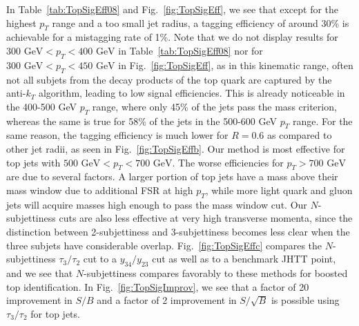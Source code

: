 \documentclass{JHEP3}
\DeclareRobustCommand{\Tab}[1]{Table~\ref{#1}}
\DeclareRobustCommand{\Fig}[1]{Fig.~\ref{#1}}
\begin{document}
In \Tab{tab:TopSigEff08} and \Fig{fig:TopSigEff}, we see that except for the highest $p_T$ range and a too small jet radius, a tagging efficiency of around 30\% is achievable for a mistagging rate of 1\%.  Note that we do not display results for $300 \text{ GeV} < p_T < 400 \text{ GeV}$ in \Tab{tab:TopSigEff08} nor for $300 \text{ GeV} < p_T < 450 \text{ GeV}$ in \Fig{fig:TopSigEff}, as in this kinematic range, often not all subjets from the decay products of the top quark are captured by the anti-$k_T$ algorithm, leading to low signal efficiencies.  This is already noticeable in the 400-500 GeV $p_T$ range, where only 45\% of the jets pass the mass criterion, whereas the same is true for 58\% of the jets in the 500-600 GeV $p_T$ range.  For the same reason, the tagging efficiency is much lower for $R=0.6$ as compared to other jet radii, as seen in \Fig{fig:TopSigEffb}.  Our method is most effective for top jets with $500 \text{ GeV} < p_T < 700 \text{ GeV}$.  The worse efficiencies for $p_T > 700 \text{ GeV}$ are due to several factors.  A larger portion of top jets have a mass above their mass window due to additional FSR at high $p_T$, while more light quark and gluon jets will acquire masses high enough to pass the mass window cut.  Our $N$-subjettiness cuts are also less effective at very high transverse momenta, since the distinction between 2-subjettiness and 3-subjettiness becomes less clear when the three subjets have considerable overlap.  \Fig{fig:TopSigEffc} compares the $N$-subjettiness $\tau_3/\tau_2$ cut to a $y_{34} / y_{23}$ cut as well as to a benchmark JHTT point, and we see that $N$-subjettiness compares favorably to these methods for boosted top identification.  In \Fig{fig:TopSigImprov}, we see that a factor of 20 improvement in $S/B$ and a factor of 2 improvement in $S/\sqrt{B}$ is possible using $\tau_3/\tau_2$ for top jets.
\end{document}
